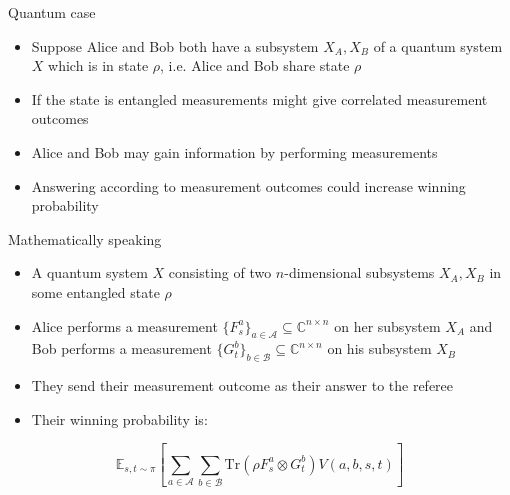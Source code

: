 \begin{frame}{Quantum case}
\begin{itemize}
    \item Suppose Alice and Bob both have a subsystem $X_A, X_B$ of a quantum system $X$ which is in state $\rho$, i.e. Alice and Bob share state $\rho$ \pause
    \item If the state is entangled measurements might give correlated measurement outcomes \pause
    \item Alice and Bob may gain information by performing measurements \pause
    \item Answering according to measurement outcomes could increase winning probability 
\end{itemize}
\end{frame}


\begin{frame}{Mathematically speaking}
\begin{itemize}
    \item A quantum system $X$ consisting of two $n$-dimensional subsystems $X_A, X_B$ in some entangled state $\rho$
    \item Alice performs a measurement $\{ F_s^a \}_{a\in \mathcal{A}}\subseteq \mathbb{C}^{n \times n}$ on her subsystem $X_A$ and Bob performs a measurement $\{ G_t^b\}_{b \in \mathcal{B}} \subseteq \mathbb{C}^{n \times n}$ on his subsystem $X_B$
    \item They send their measurement outcome as their answer to the referee
    \item Their winning probability is:
\end{itemize}
\begin{equation*}
\mathbb{E}_{s,t \sim \pi} \left[ \sum_{a \in \mathcal{A}} \sum_{b \in \mathcal{B}} \text{Tr}(\rho F_s^a \otimes G_t^b) V(a,b,s,t) \right]
\end{equation*}  
\end{frame}

